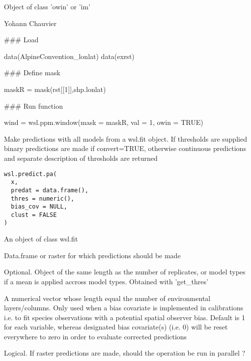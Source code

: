 \documentclass[a4paper]{book}
\begin{document}
%
\begin{Value}
Object of class 'owin' or 'im'
\end{Value}
%
\begin{Author}\relax
Yohann Chauvier
\end{Author}
%
\begin{Examples}
\begin{ExampleCode}

### Load

data(AlpineConvention_lonlat)
data(exrst)

### Define mask

maskR = mask(rst[[1]],shp.lonlat)

### Run function

wind = wsl.ppm.window(mask = maskR,
                      val = 1,
                      owin = TRUE)

\end{ExampleCode}
\end{Examples}
%
\begin{Description}\relax
Make predictions with all models from a wsl.fit object. If thresholds are supplied
binary predictions are made if convert=TRUE, otherwise continuous predictions and
separate description of thresholds are returned
\end{Description}
%
\begin{Usage}
\begin{verbatim}
wsl.predict.pa(
  x,
  predat = data.frame(),
  thres = numeric(),
  bias_cov = NULL,
  clust = FALSE
)
\end{verbatim}
\end{Usage}
%
\begin{Arguments}
\begin{ldescription}
\item[\code{x}] An object of class wsl.fit

\item[\code{predat}] Data.frame or raster for which predictions should be made

\item[\code{thres}] Optional. Object of the same length as the number of replicates, or model
types if a mean is applied accross model types. Obtained with 'get\_thres'

\item[\code{bias\_cov}] A numerical vector whose length equal the number of environmental layers/columns.
Only used when a bias covariate is implemented in calibrations i.e. to fit species observations with
a potential spatial observer bias. Default is 1 for each variable, whereas designated bias covariate(s)
(i.e. 0) will be reset everywhere to zero in order to evaluate corrected predictions

\item[\code{clust}] Logical. If raster predictions are made, should the operation be run in parallel ?
\end{ldescription}
\end{Arguments}
\end{document}
